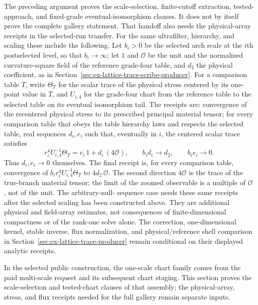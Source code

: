 The preceding argument proves the scale-selection, finite-cutoff extraction,
tested-approach, and fixed-grade eventual-isomorphism clauses. It does not
by itself prove the complete gallery statement. That handoff also needs the
physical-array receipts in the selected-run transfer. For the same
ultrafilter, hierarchy, and scaling these include the following. Let
$b_i>0$ be the selected arch scale at the $i$th postselected level, so
that $b_i\to\infty$; let $1$ and $\mathcal O$ be the unit and the
normalized curvature-square field of the reference grade-four table, and
$d_2$ the physical coefficient, as in
Section~\ref{sec:ex-lattice-trace-scribe-producer}. For a comparison table
$T$, write $\Theta_T$ for the scalar trace of the physical stress centered
by its one-point value in $T$, and $U_{i,4}$ for the grade-four chart from
the reference table to the selected table on its eventual isomorphism
tail. The receipts are:
convergence of the recentered physical stress to its prescribed principal
material tensor; for every comparison table that obeys the table hierarchy
laws and respects the selected table, real sequences $d_i,e_i$ such that,
eventually in $i$, the centered scalar trace satisfies
\[
 r_i^4U_{i,4}^{-1}\Theta_T=e_i\,1+d_i\,(4\mathcal O),
 \qquad b_id_i\longrightarrow d_2,\qquad b_ie_i\longrightarrow0.
\]
Thus $d_i,e_i\to0$ themselves. The final receipt is, for every comparison
table, convergence of $b_ir_i^4U_{i,4}^{-1}\Theta_T$ to
$4d_2\,\mathcal O$. The second direction
$4\mathcal O$ is the trace of the true-branch material tensor; the limit
of the zoomed observable is a multiple of $\mathcal O$, not of the unit. The arbitrary-null-
sequence case needs these same receipts after the selected scaling has
been constructed above. They are additional physical and field-array
estimates, not consequences of finite-dimensional compactness or of the
rank-one solve alone. The correction, one-dimensional
kernel, stable inverse, flux normalization, and physical/reference shell
comparison in Section~\ref{sec:ex-lattice-trace-producer} remain conditional
on their displayed analytic receipts.

In the selected public construction, the one-scale chart family comes from
the paid multi-scale request and its subsequent chart staging. This section
proves the scale-selection and tested-chart clauses of that assembly; the
physical-array, stress, and flux receipts needed for the full gallery remain
separate inputs.
